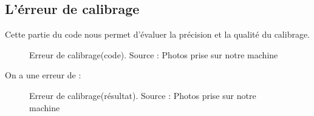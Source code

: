 \subsection{L'érreur de calibrage}

Cette partie du code nous permet d'évaluer la précision et la qualité du calibrage.

\begin{figure}[H]%
	\center%
	\setlength{\fboxsep}{5pt}%
	\setlength{\fboxrule}{0.5pt}%
	\caption[Erreur de calibrage(code)]{Erreur de calibrage(code). Source : Photos prise sur notre machine}
	\label{fig:Erreur de calibrage(code)}
\end{figure}

 
On a une erreur de :


\begin{figure}[H]%
	\center%
	\setlength{\fboxsep}{5pt}%
	\setlength{\fboxrule}{0.5pt}%
	\caption[ Erreur de calibrage(résultat)]{Erreur de calibrage(résultat). Source : Photos prise sur notre machine}
	\label{fig:Erreur de calibrage(résultat)}
\end{figure}






 
 
 
 	
